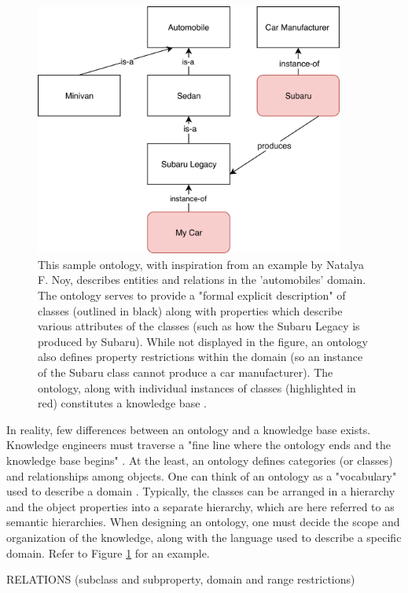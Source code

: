 \documentclass{article}
\begin{document}
\begin{figure}[h]
\centering
\includegraphics[width=4in]{sample_ontology}
\caption{This sample ontology, with inspiration from an example by Natalya F. Noy, describes entities and relations in the 'automobiles' domain. The ontology serves to provide a "formal explicit description" of classes (outlined in black) along with properties which describe various attributes of the classes (such as how the Subaru Legacy is produced by Subaru). While not displayed in the figure, an ontology also defines property restrictions within the domain (so an instance of the Subaru class cannot produce a car manufacturer). The ontology, along with individual instances of classes (highlighted in red) constitutes a knowledge base \cite{noy2001ontology}. }
\label{fig:sample_ontology}
\end{figure}

 
In reality, few differences between an ontology and a knowledge base exists. Knowledge engineers must traverse a "fine line where the ontology ends and the knowledge base begins" \cite{noy2001ontology}. At the least, an ontology defines categories (or classes) and relationships among objects. One can think of an ontology as a "vocabulary" used to describe a domain \cite[308]{russell2016artificial}. Typically, the classes can be arranged in a hierarchy and the object properties into a separate hierarchy, which are here referred to as semantic hierarchies. When designing an ontology, one must decide the scope and organization of the knowledge, along with the language used to describe a specific domain. Refer to Figure \ref{fig:sample_ontology} for an example. 

RELATIONS  (subclass and subproperty, domain and range restrictions)
\end{document}

